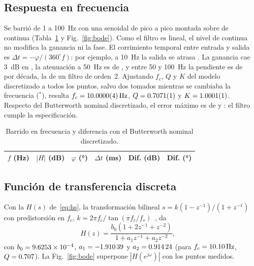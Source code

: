 \subsection{Respuesta en frecuencia}
Se barrió de 1 a \SI{100}{\hertz} con una senoidal de \val{\resVinPP}{\volt} pico a pico montada sobre \val{\resOffsetBarrido}{\volt} de continua (Tabla~\ref{tab:barrido} y Fig.~\ref{fig:bode}). Como el filtro es lineal, el nivel de continua no modifica la ganancia ni la fase. El corrimiento temporal entre entrada y salida es $\Delta t = -\varphi/(360^\circ f)$: por ejemplo, a \SI{10}{\hertz} la salida se atrasa \val{\resDtDiez}{\milli\second}. La ganancia cae \SI{3}{\dB} en \val{\resFTres}{\hertz}, la atenuación a \SI{50}{\hertz} es de \val{\resDbCincuenta}{\dB}, y entre 50 y \SI{100}{\hertz} la pendiente es de \val{\resPend}{\dB} por década, la de un filtro de orden~2. Ajustando $f_c$, $Q$ y $K$ del modelo discretizado a todos los puntos, salvo dos tomados mientras se cambiaba la frecuencia ($^{*}$), resulta $f_c = \val{\resFcFit \pm \resSFcFit}{\hertz}$, $Q = \nm{\resQFit \pm \resSQFit}$ y $K = \nm{\resKFit \pm \resSKFit}$. Respecto del Butterworth nominal discretizado, el error máximo es de \val{\resMaxEdb}{\dB} y \val{\resMaxEfa}{\degree}: el filtro cumple la especificación.

\begin{table}[!htb]
\centering
\caption{Barrido en frecuencia y diferencia con el Butterworth nominal discretizado.}
\label{tab:barrido}
\footnotesize
\setlength{\tabcolsep}{3.5pt}
\begin{tabular}{rrrrrr}
\toprule
$f$ (Hz) & $|H|$ (dB) & $\varphi$ (°) & $\Delta t$ (ms) & Dif. (dB) & Dif. (°) \\
\midrule

\end{tabular}
\end{table}

\subsection{Función de transferencia discreta}
Con la $H(s)$ de~\eqref{eq:hs}, la transformación bilineal $s = k(1 - z^{-1})/(1 + z^{-1})$ con predistorsión en $f_c$, $k = 2\pi f_c/\tan(\pi f_c/f_s)$~\cite{oppenheim}, da
\begin{equation}
H(z) = \frac{b_0 (1 + 2z^{-1} + z^{-2})}{1 + a_1 z^{-1} + a_2 z^{-2}},
\label{eq:hz}
\end{equation}
con $b_0 = \num{9.6253e-04}$, $a_1 = \num{-1,91039}$ y $a_2 = \num{0,91424}$ (para $f_c = \SI{10,10}{\hertz}$, $Q = \num{0,707}$). La Fig.~\ref{fig:bode} superpone $|H(e^{j\omega})|$ con los puntos medidos.

